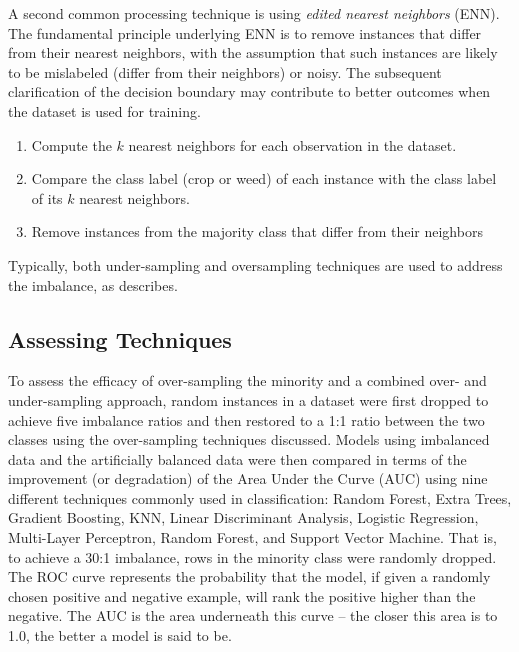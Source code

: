 \documentclass[letterpaper]{report}
\begin{document}
A second common processing technique is using \textit{edited nearest neighbors} (ENN). The fundamental principle underlying ENN is to remove instances that differ from their nearest neighbors, with the assumption that such instances are likely to be mislabeled (differ from their neighbors) or noisy. The subsequent clarification of the decision boundary may contribute to better outcomes when the dataset is used for training.
\begin{enumerate}
\item{Compute the $k$ nearest neighbors for each observation in the dataset.}
\item{Compare the class label (crop or weed) of each instance with the class label of its $k$ nearest neighbors.}
\item{Remove instances from the majority class that differ from their neighbors}
\end{enumerate}

Typically, both under-sampling and oversampling techniques are used to address the imbalance, as \citeauthor{Batista2004-qz} \citeyear{Batista2004-qz} describes. 

\subsection{Assessing Techniques}
To assess the efficacy of over-sampling the minority and a combined over- and under-sampling approach, random instances in a dataset were first dropped to achieve five imbalance ratios and then restored to a 1:1 ratio between the two classes using the over-sampling techniques discussed. Models using imbalanced data and the artificially balanced data were then compared in terms of the improvement (or degradation) of the Area Under the Curve (AUC) using nine different techniques commonly used in classification: Random Forest, Extra Trees, Gradient Boosting, KNN, Linear Discriminant Analysis, Logistic Regression, Multi-Layer Perceptron, Random Forest, and Support Vector Machine. That is, to achieve a 30:1 imbalance, rows in the minority class were randomly dropped. The \gls{ROC} curve represents the probability that the model, if given a randomly chosen positive and negative example, will rank the positive higher than the negative. The AUC is the area underneath this curve -- the closer this area is to 1.0, the better a model is said to be.
\end{document}
